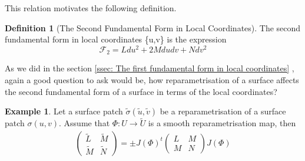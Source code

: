\documentclass{article}
\theoremstyle{plain}
\theoremstyle{definition}
\newtheorem{definition}{Definition}
\newtheorem{example}{Example}
\theoremstyle{remark}
\begin{document}
This relation motivates the following definition.
\begin{definition}[The Second Fundamental Form in Local Coordinates]
    The second fundamental form in local coordinates \{u,v\} is the expression \[ \mathcal{F}_2 = L du^2 + 2M dudv + N dv^2\]
\end{definition}

As we did in the section \ref{ssec: The first fundamental form in local coordinates} , again a good question to ask would be, how reparametrisation of a surface affects the second fundamental form of a surface in terms of the local coordinates?

\begin{example}
    Let a surface patch \( \tilde{\sigma}(\tilde{u}, \tilde{v})\) be a reparametrisation of a surface patch \(\sigma(u,v)\). Assume that \(\Phi: U \rightarrow \tilde{U}\) is a smooth reparametrisation map, then
    \begin{align}
        \begin{pmatrix}
            \tilde{L} & \tilde{M} \\
            \tilde{M} & \tilde{N}
        \end{pmatrix}
        = \pm J(\Phi)^t
        \begin{pmatrix}
            L & M \\
            M & N
        \end{pmatrix}
        J(\Phi)
    \end{align}
\end{example}
\end{document}
